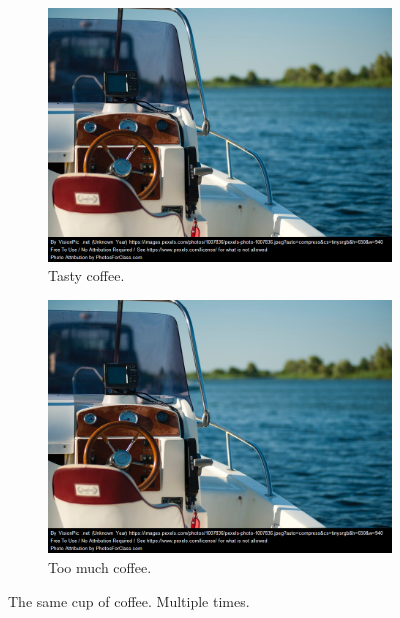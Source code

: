\documentclass{article}
\begin{document}
\begin{figure}[h!]
\begin{subfigure}[b]{0.2\linewidth}
			\includegraphics[width=\linewidth]{boat.png}
			\caption{Tasty coffee.}
		\end{subfigure}
		\begin{subfigure}[b]{0.5\linewidth}
			\includegraphics[width=\linewidth]{boat.png}
			\caption{Too much coffee.}
		\end{subfigure}
		\caption{The same cup of coffee. Multiple times.}
		\label{fig:coffee3}
	\end{figure}
\end{document}
